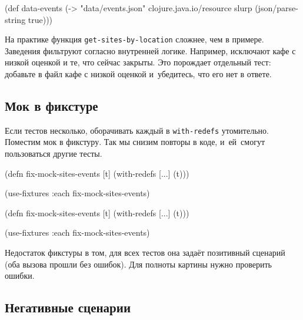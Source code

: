 
\begin{english}
  \begin{clojure}
(def data-events
  (-> "data/events.json"
      clojure.java.io/resource
      slurp
      (json/parse-string true)))
  \end{clojure}
\end{english}

\mnoindent
На практике функция \verb|get-sites-by-location| сложнее, чем в
примере. Заведения фильтруют согласно внутренней логике. Например, исключают
кафе с низкой оценкой и те, что сейчас закрыты. Это порождает отдельный тест:
добавьте в файл кафе с низкой оценкой и~убедитесь, что его нет в ответе.

\subsection{Мок в фикстуре}


Если тестов несколько, оборачивать каждый в \verb|with-redefs|
утомительно. Поместим мок в фикстуру. Так мы снизим повторы в коде, и~ей~смогут
пользоваться другие тесты.

\ifx\DEVICETYPE\MOBILE

\begin{english}
  \begin{clojure}
(defn fix-mock-sites-events [t]
  (with-redefs [...]
    (t)))

(use-fixtures :each
  fix-mock-sites-events)
  \end{clojure}
\end{english}

\else

\begin{english}
  \begin{clojure}
(defn fix-mock-sites-events [t]
  (with-redefs [...]
    (t)))

(use-fixtures :each fix-mock-sites-events)
  \end{clojure}
\end{english}

\fi

Недостаток фикстуры в том, для всех тестов она задаёт позитивный сценарий (оба
вызова прошли без ошибок). Для полноты картины нужно проверить ошибки.

\subsection{Негативные сценарии}

